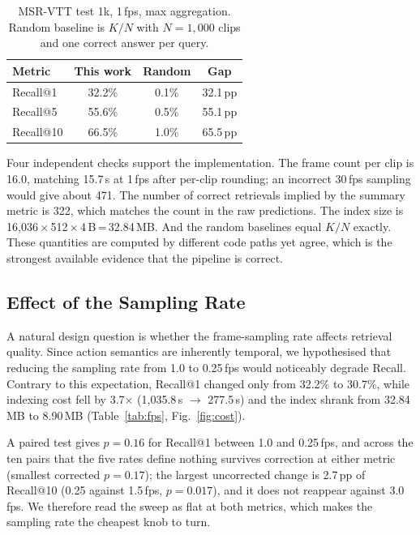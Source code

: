 \documentclass[journal]{IEEEtran}
\begin{document}
\begin{table}[t]
\centering
\caption{MSR-VTT test 1k, 1\,fps, max aggregation. Random baseline is $K/N$ with $N=1{,}000$
clips and one correct answer per query.}
\label{tab:main}
\begin{tabular*}{\columnwidth}{@{\extracolsep{\fill}}lccc@{}}
\toprule
Metric & This work & Random & Gap \\
\midrule
Recall@1  & 32.2\% & 0.1\% & 32.1\,pp \\
Recall@5  & 55.6\% & 0.5\% & 55.1\,pp \\
Recall@10 & 66.5\% & 1.0\% & 65.5\,pp \\
\bottomrule
\end{tabular*}
\end{table}

Four independent checks support the implementation. The frame count per clip is 16.0, matching
15.7\,s at 1\,fps after per-clip rounding; an incorrect 30\,fps sampling would give about 471. The
number of
correct retrievals implied by the summary metric is 322, which matches the count in the raw
predictions. The index size is 16{,}036\,$\times$\,512\,$\times$\,4\,B\,=\,32.84\,MB. And the
random baselines equal $K/N$ exactly. These quantities are computed by different code paths yet
agree, which is the strongest available evidence that the pipeline is correct.

\subsection{Effect of the Sampling Rate}\label{sec:fps}
A natural design question is whether the frame-sampling rate affects retrieval quality. Since
action semantics are inherently temporal, we hypothesised that reducing the sampling rate from
1.0 to 0.25\,fps would noticeably degrade Recall. Contrary to this expectation, Recall@1 changed
only from 32.2\% to 30.7\%, while indexing cost fell by 3.7$\times$ (1{,}035.8\,s $\rightarrow$
277.5\,s) and the index shrank from 32.84\,MB to 8.90\,MB (Table~\ref{tab:fps},
Fig.~\ref{fig:cost}). 

A paired test gives $p=0.16$ for Recall@1 between 1.0 and 0.25\,fps, and
across the ten pairs that the five rates define nothing survives correction at either metric
(smallest corrected $p=0.17$); the largest uncorrected change is 2.7\,pp of Recall@10
(0.25 against 1.5\,fps, $p=0.017$), and it does not reappear against 3.0\,fps. We therefore read the sweep
as flat at both metrics, which makes the sampling rate the cheapest knob to turn. 
\end{document}
